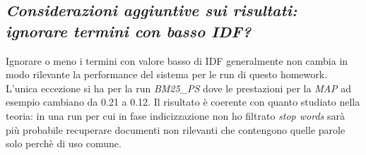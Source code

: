 \documentclass[a4paper, 9pt]{article}
\begin{document}
\subsection*{\textit{Considerazioni aggiuntive sui risultati: ignorare termini con basso IDF?}}
\par Ignorare o meno i termini con valore basso di IDF generalmente non cambia in modo rilevante la performance del sistema per le run di questo homework. L'unica eccezione si ha per la run \textit{BM25\_PS} dove le prestazioni per la \textit{MAP} ad esempio cambiano da 0.21 a 0.12.
Il risultato è coerente con quanto studiato nella teoria: in una run per cui in fase indicizzazione non ho filtrato \textit{stop words} sarà più probabile recuperare documenti non rilevanti che contengono quelle parole solo perchè di uso comune.
\end{document}
